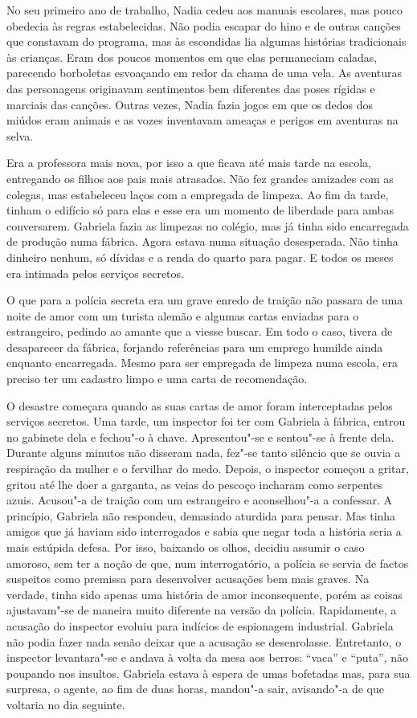 No seu primeiro ano de trabalho, Nadia cedeu aos manuais escolares, mas
pouco obedecia às regras estabelecidas. Não podia escapar do hino e de
outras canções que constavam do programa, mas às escondidas lia algumas histórias tradicionais às crianças. Eram dos poucos momentos em que
elas permaneciam caladas, parecendo borboletas esvoaçando em redor da
chama de uma vela. As aventuras das personagens originavam sentimentos
bem diferentes das poses rígidas e marciais das canções. Outras vezes,
Nadia fazia jogos em que os dedos dos miúdos eram animais e as vozes
inventavam ameaças e perigos em aventuras na selva.

Era a professora mais nova, por isso a que ficava até mais tarde na
escola, entregando os filhos aos pais mais atrasados. Não fez grandes
amizades com as colegas, mas estabeleceu laços com a empregada de
limpeza. Ao fim da tarde, tinham o edifício só para elas e esse era um
momento de liberdade para ambas conversarem. Gabriela fazia as limpezas
no colégio, mas já tinha sido encarregada de produção numa fábrica.
Agora estava numa
situação desesperada. Não tinha dinheiro nenhum, só dívidas e a renda do
quarto para pagar. E todos os meses era intimada pelos serviços
secretos.

O que para a polícia secreta era um grave enredo de traição não passara
de uma noite de amor com um turista alemão e algumas cartas enviadas
para o estrangeiro, pedindo ao amante que a viesse buscar. Em todo o
caso, tivera de desaparecer da fábrica, forjando referências para um
emprego humilde ainda enquanto encarregada. Mesmo para ser empregada de
limpeza numa escola, era preciso ter um cadastro limpo e uma carta de
recomendação.

O desastre começara quando as suas cartas de amor foram interceptadas
pelos serviços secretos. Uma tarde, um inspector foi ter com Gabriela à
fábrica, entrou no gabinete dela e fechou"-o à chave. Apresentou"-se e
sentou"-se à frente dela. Durante alguns minutos não disseram nada, fez"-se
tanto silêncio que se ouvia a respiração da mulher e o fervilhar do
medo. Depois, o inspector começou a gritar, gritou até lhe doer a
garganta, as veias do pescoço incharam como serpentes azuis. Acusou"-a de
traição com um estrangeiro e aconselhou"-a a confessar. A princípio,
Gabriela não respondeu, demasiado aturdida para pensar. Mas tinha
amigos que já haviam sido interrogados e sabia que negar toda a história
seria a mais estúpida defesa. Por isso, baixando os olhos, decidiu assumir o caso amoroso, sem ter a noção de que, num interrogatório, a
polícia se servia de factos suspeitos como premissa para desenvolver
acusações bem mais graves. Na verdade, tinha sido apenas uma história de
amor inconsequente, porém as coisas ajustavam"-se de maneira muito
diferente na
versão da polícia. Rapidamente, a acusação do inspector evoluiu para
indícios de espionagem industrial. Gabriela não podia fazer nada senão
deixar que a acusação se desenrolasse. Entretanto, o inspector
levantara"-se e andava à volta da mesa aos berros: ``vaca'' e ``puta'', não
poupando nos insultos. Gabriela estava à espera de umas bofetadas mas,
para sua surpresa, o agente, ao fim de duas horas, mandou"-a sair,
avisando"-a de que voltaria no dia seguinte.

